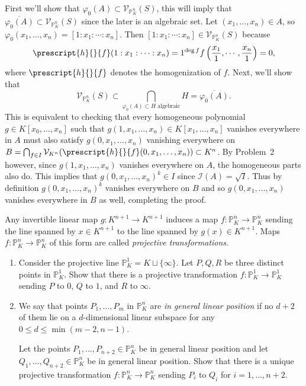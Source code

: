 \documentclass[11pt,letterpaper]{article}
\begin{document}
\begin{solution}
    First we'll show that $\varphi_0(A)\subset \mathcal{V}_{\mathbb{P}^n_K}(S)$, this will imply that $\overline{\varphi_0(A)}\subset \mathcal{V}_{\mathbb{P}_K^n}(S)$ since the later is an algebraic set. Let $(x_1,\ldots,x_n)\in A$, so $\varphi_0(x_1,\ldots,x_n)=[1:x_1:\cdots:x_n]$. Then $[1:x_1:\cdots:x_n]\in \mathcal{V}_{\mathbb{P}_K^n}(S)$ because 
    \[
        \prescript{h}{}{f}(1:x_1:\cdots:x_n) = 1^{\deg f} f\left(\frac{x_1}{1},\cdots, \frac{x_n}{1}\right)=0,
    \]
    where $\prescript{h}{}{f}$ denotes the homogenization of $f$. Next, we'll show that
    \[
        \mathcal{V}_{\mathbb{P}_K^n}(S) \subset \bigcap_{\varphi_0(A) \subset H\textrm{ algebraic}} H = \overline{\varphi_0(A)}.
    \] 
    This is equivalent to checking that every homogeneous polynomial $g\in K[x_0,\ldots,x_n]$ such that $g(1,x_1,\ldots,x_n)\in K[x_1,\ldots,x_n]$ vanishes everywhere in $A$ must also satisfy $g(0,x_1,\ldots,x_n)$ vanishing everywhere on $B=\bigcap_{f\in I}\mathcal{V}_{K^n}(\prescript{h}{}{f}(0, x_1,\ldots,x_n))\subset K^n$. By Problem~2 however, since $g(1,x_1,\ldots,x_n)$ vanishes everywhere on $A$, the homogeneous parts also do.  This implies that $g(0,x_1,\ldots,x_n)^k\in I$ since $\mathcal{I}(A)=\sqrt{I}$. Thus by definition $g(0,x_1,\ldots,x_n)^k$ vanishes everywhere on $B$ and so $g(0,x_1,\ldots,x_n)$ vanishes everywhere in $B$ as well, completing the proof.
\end{solution}

\begin{problem}\noindent
    Any invertible linear map $g:K^{n+1}\rightarrow K^{n+1}$ induces a map $f:\mathbb P^n_K\rightarrow\mathbb P^n_K$ sending the line spanned by $x\in K^{n+1}$ to the line spanned by $g(x)\in K^{n+1}$. Maps $f:\mathbb P^n_K\rightarrow\mathbb P^n_K$ of this form are called \emph{projective transformations}.
    \begin{enumerate}[label=\alph*)]
        \item Consider the projective line $\mathbb P^1_K=K\sqcup\{\infty\}$. Let $P,Q,R$ be three distinct points in $\mathbb P^1_K$. Show that there is a projective transformation $f:\mathbb P^1_K\rightarrow\mathbb P^1_K$ sending $P$ to $0$, $Q$ to $1$, and $R$ to $\infty$.
        \item We say that points $P_1,\dots,P_m$ in $\mathbb P^n_K$ are \emph{in general linear position} if no $d+2$ of them lie on a $d$-dimensional linear subspace for any $0\leq d\leq\min(m-2,n-1)$.

        Let the points $P_1,\dots,P_{n+2}\in\mathbb P^n_K$ be in general linear position and let $Q_1,\dots,Q_{n+2}\in\mathbb P^n_K$ be in general linear position. Show that there is a unique projective transformation $f:\mathbb P^n_K\rightarrow\mathbb P^n_K$ sending $P_i$ to $Q_i$ for $i=1,\dots,n+2$.
    \end{enumerate}
\end{problem}
\end{document}
